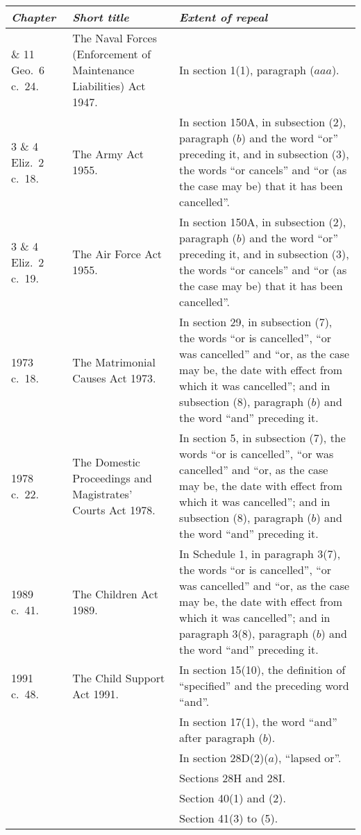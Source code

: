 \documentclass[12pt,a4paper]{article}
\begin{document}
{\footnotesize
\begin{longtable}{p{50pt}p{83.27403pt}p{220.72266pt}}
\hline
\itshape Chapter	&\itshape Short title	&\itshape Extent of repeal\\
\hline
\endhead
\hline
\endlastfoot
10 \& 11 Geo.\ 6 c.\ 24. 	&The Naval Forces (Enforcement of Maintenance Liabilities) Act 1947. 	&In section 1(1), paragraph ($aaa$).\\
3 \& 4 Eliz.\ 2 c.\ 18. 	&The Army Act 1955. 	&In section 150A, in subsection (2), paragraph ($b$)  and the word “or” preceding it, and in subsection (3), the words “or cancels” and “or (as the case may be) that it has been cancelled”.\\
3 \& 4 Eliz.\ 2 c.\ 19. 	&The Air Force Act 1955. 	&In section 150A, in subsection (2), paragraph ($b$)  and the word “or” preceding it, and in subsection (3), the words “or cancels” and “or (as the case may be) that it has been cancelled”.\\
1973 c.\ 18. 	&The Matrimonial Causes Act 1973. 	&In section 29, in subsection (7), the words “or is cancelled”, “or was cancelled” and “or, as the case may be, the date with effect from which it was cancelled”; and in subsection (8), paragraph ($b$)  and the word “and” preceding it.\\
1978 c.\ 22. 	&The Domestic Proceedings and Magistrates' Courts Act 1978. 	&In section 5, in subsection (7), the words “or is cancelled”, “or was cancelled” and “or, as the case may be, the date with effect from which it was cancelled”; and in subsection (8), paragraph ($b$)  and the word “and” preceding it.\\
1989 c.\ 41. 	&The Children Act 1989. 	&In Schedule 1, in paragraph 3(7), the words “or is cancelled”, “or was cancelled” and “or, as the case may be, the date with effect from which it was cancelled”; and in paragraph 3(8), paragraph ($b$)  and the word “and” preceding it.\\
1991 c.\ 48. 	&The Child Support Act 1991. 	&In section 15(10), the definition of “specified” and the preceding word “and”.\\
		&&In section 17(1), the word “and” after paragraph ($b$).\\
		&&In section 28D(2)($a$), “lapsed or”.\\
		&&Sections 28H and 28I.\\
		&&Section 40(1)  and (2).\\
		&&Section 41(3)  to (5).\\

\end{longtable}}
\end{document}
